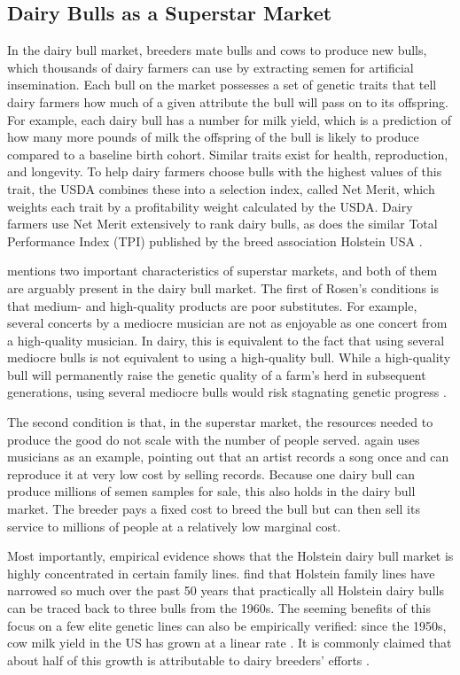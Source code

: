 \documentclass[12pt,letterpaper]{article}
\begin{document}
\subsection{Dairy Bulls as a Superstar Market}
In the dairy bull market, breeders mate bulls and cows to produce new bulls, which thousands of dairy farmers can use by extracting semen for artificial insemination. Each bull on the market possesses a set of genetic traits that tell dairy farmers how much of a given attribute the bull will pass on to its offspring. For example, each dairy bull has a number for milk yield, which is a prediction of how many more pounds of milk the offspring of the bull is likely to produce compared to a baseline birth cohort.
Similar traits exist for health, reproduction, and longevity. To help dairy farmers choose bulls with the highest values of this trait, the USDA combines these into a selection index, called Net Merit, which weights each trait by a profitability weight calculated by the USDA. Dairy farmers use Net Merit extensively to rank dairy bulls, as does the similar Total Performance Index (TPI) published by the breed association Holstein USA \citep{hutchins2026market,VanRaden2021}.

\citet{rosen_economics_1981} mentions two important characteristics of superstar markets, and both of them are arguably present in the dairy bull market. The first of Rosen's conditions is that medium- and high-quality products are poor substitutes. For example, several concerts by a mediocre musician are not as enjoyable as one concert from a high-quality musician. In dairy, this is equivalent to the fact that using several mediocre bulls is not equivalent to using a high-quality bull. While a high-quality bull will permanently raise the genetic quality of a farm's herd in subsequent generations, using several mediocre bulls would risk stagnating genetic progress \citep{hutchins_role_2024}.

The second condition is that, in the superstar market, the resources needed to produce the good do not scale with the number of people served. \citet{rosen_economics_1981} again uses musicians as an example, pointing out that an artist records a song once and can reproduce it at very low cost by selling records. Because one dairy bull can produce millions of semen samples for sale, this also holds in the dairy bull market. The breeder pays a fixed cost to breed the bull but can then sell its service to millions of people at a relatively low marginal cost.

Most importantly, empirical evidence shows that the Holstein dairy bull market is highly concentrated in certain family lines. \citet{Yue2015} find that Holstein family lines have narrowed so much over the past 50 years that practically all Holstein dairy bulls can be traced back to three bulls from the 1960s. The seeming benefits of this focus on a few elite genetic lines can also be empirically verified: since the 1950s, cow milk yield in the US has grown at a linear rate \citep{Hutchins_Hueth2023}. It is commonly claimed that about half of this growth is attributable to dairy breeders' efforts \citep{cdcbimpact}.
\end{document}
